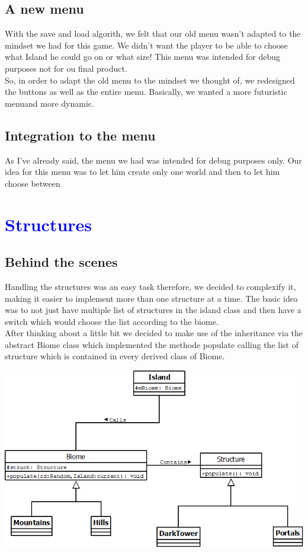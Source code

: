 \documentclass[article]{report}             %
\begin{document}
			\section{A new menu}
					With the save and load algorith, we felt that our old menu wasn't adapted to the mindset we had for this game. We didn't want the player to be able to choose what Island he could go on or what size! This menu was intended for debug purposes not for ou final product.\\

					So, in order to adapt the old menu to the mindset we thought of, we redesigned the buttons as well as the entire menu. Basically, we wanted a more futuristic menuand more dynamic.

			\section{Integration to the menu}
					As I've already said, the menu we had was intended for debug purposes only. Our idea for this menu was to let him create only one world and then to let him choose between 


		\chapter{\textcolor{blue}{Structures}}
			\section{Behind the scenes}
				Handling the structures was an easy task therefore, we decided to complexify it, making it easier to implement more than one structure at a time. The basic idea was to not just have multiple list of structures in the island class and then have a switch which would choose the list according to the biome.\\

				After thinking about a little bit we decided to make use of the inheritance via the abstract Biome class which implemented the methode populate calling the list of structure which is contained in every derived class of Biome.
				\begin{center}
					\includegraphics[width=15cm]{images/Structures.png}
				\end{center}
\end{document}
